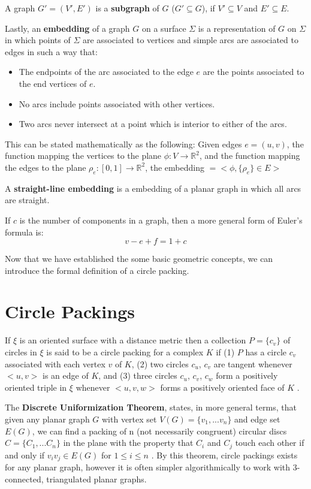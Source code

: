 \documentclass[11pt]{article}
\newcommand{\R}{\mathbb{R}}
\begin{document}
  A graph $G' = (V',E')$ is a \textbf{subgraph} of $G$ ($G' \subseteq G$), if $V' \subseteq V$ and $E' \subseteq E$.
  
  Lastly, an \textbf{embedding} of a graph $G$ on a surface $\Sigma$ is a representation of $G$ on $\Sigma$ in which points of $\Sigma$ are associated to vertices and simple arcs are associated to edges in such a way that:
  \begin{itemize}
	\item The endpoints of the arc associated to the edge $e$ are the points associated to the end vertices of $e$.
	\item No arcs include points associated with other vertices.
	\item Two arcs never intersect at a point which is interior to either of the arcs.
  \end{itemize}
  This can be stated mathematically as the following: Given edges $e=(u,v)$, the function mapping the vertices to the plane $ \phi :V \rightarrow \R^2$, and the function mapping the edges to the plane $ \rho_e :[0,1] \rightarrow \R^2$, the embedding $= <\phi, \{\rho_e\} \in E >$

  A \textbf{straight-line embedding} is a embedding of a planar graph in which all arcs are straight.


  If $c$ is the number of components in a graph, then a more general form of Euler's formula is:
  \begin{equation} 
	v-e+f= 1 + c
  \end{equation}

Now that we have established the some basic geometric concepts, we can introduce the formal definition of a circle packing.

\section{Circle Packings}
If $\xi$ is an oriented surface with a distance metric then a collection $P = \{c_v\}$ of circles in $\xi$ is said to be a circle packing for a complex $K$ if (1) $P$ has a circle $c_v$ associated with each vertex $v$ of $K$, (2) two circles $c_u$, $c_v$ are tangent whenever $<u,v>$ is an edge of $K$, and (3) three circles $c_u$, $c_v$, $c_w$ form a positively oriented triple in $\xi$ whenever $<u,v,w>$ forms a positively oriented face of $K$ \cite{stephenson05introduction}. 

The \textbf{Discrete Uniformization Theorem}, states, in more general terms, that given any planar graph $G$ with vertex set $V(G) = \{v_1, ... v_n \}$ and edge set $E(G)$, we can find a packing of n (not necessarily congruent) circular discs $C= \{C_1,... C_n\}$ in the plane with the property that $C_i$ and $C_j$ touch each other if and only if $v_i v_j \in E(G)$ for $1 \le i \le n$ \cite{stephenson05introduction}.
By this theorem, circle packings exists for any planar graph, however it is often simpler algorithmically to work with 3-connected, triangulated planar graphs.
\end{document}
